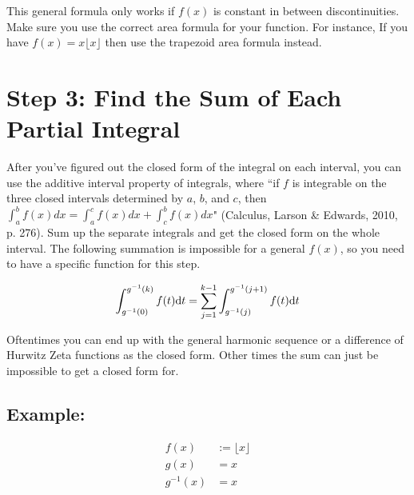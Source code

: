 \documentclass[12pt]{article}
\begin{document}
		This general formula only works if $f(x)$ is constant in between discontinuities. Make sure you
		use the correct area formula for your function. For instance, If you have $f(x)=x\lfloor x\rfloor$
		then use the trapezoid area formula instead.

\section*{Step 3: Find the Sum of Each Partial Integral}

	After you've figured out the closed form of the integral on each interval, you can use the
	additive interval property of integrals, where ``if $f$ is integrable on the three closed
	intervals determined by $a$, $b$, and $c$, then $\int_a^bf(x)dx=\int_a^cf(x)dx+\int_c^bf(x)dx$"
	(Calculus, Larson \& Edwards, 2010, p. 276). Sum up the separate integrals and get the closed
	form on the whole interval. The following summation is impossible for a general $f(x)$, so you
	need to have a specific function for this step.

	\begin{align*}
		\int_{g^{-1}(0)}^{g^{-1}(k)}f(t)\text dt=\sum_{j=1}^{k-1}\int_{g^{-1}(j)}^{g^{-1}(j+1)}f(t)\text dt
	\end{align*}

	Oftentimes you can end up with the general harmonic sequence or a difference of Hurwitz Zeta functions
	as the closed form. Other times the sum can just be impossible to get a closed form for.

	\subsection*{Example:}

		\begin{minipage}{0.5\textwidth}
			\begin{align*}
				f(x) & := \lfloor x\rfloor\\
				g(x) & = x\\
				g^{-1}(x) & = x
			\end{align*}
		\end{minipage}
		\hfill
		\begin{minipage}{0.5\textwidth}
		\end{minipage}
\end{document}
